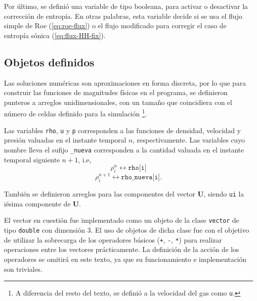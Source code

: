 Por último, se definió una variable de tipo booleana, para activar o desactivar la corrección de entropía. En otras palabras, esta variable decide si se usa el flujo simple de Roe (\ref{eq:roe-flux}) o el flujo modificado para corregir el caso de entropía sónica (\ref{eq:flux-HH-fix}).

\subsection{Objetos definidos}
Las soluciones numéricas son aproximaciones en forma discreta, por lo que para construir las funciones de magnitudes físicas en el programa, se definieron punteros a arreglos unidimensionales, con un tamaño que coincidiera con el número de celdas definido para la simulación \footnote{A diferencia del resto del texto, se definió a la velocidad del gas como \texttt{u}.}.


Las variables \texttt{rho}, \texttt{u} y \texttt{p} corresponden a las funciones de densidad, velocidad y presión valuadas en el instante temporal $n$, respectivamente. Las variables cuyo nombre lleva el sufijo \texttt{\_nueva} corresponden a la cantidad valuada en el instante temporal siguiente $n+1$, i.e,
\begin{equation}
	\rho_{i}^{n} \leftrightarrow \texttt{rho[i]}
\end{equation}
\begin{equation}
	\rho_{i}^{n+1} \leftrightarrow \texttt{rho\_nueva[i]}.
\end{equation}

También se definieron arreglos para las componentes del vector $\mathbf{{U}}$, siendo \texttt{ui} la iésima componente de $\mathbf{{U}}$.


El vector en cuestión fue implementado como un objeto de la clase \texttt{vector} de tipo \texttt{double} con dimensión 3. El uso de objetos de dicha clase fue con el objetivo de utilizar la sobrecarga de los operadores básicos (\texttt{+}, \texttt{-}, \texttt{*}) para realizar operaciones entre los vectores prácticamente. La definición de la acción de los operadores se omitirá en este texto, ya que su funcionamiento e implementación son triviales. 


